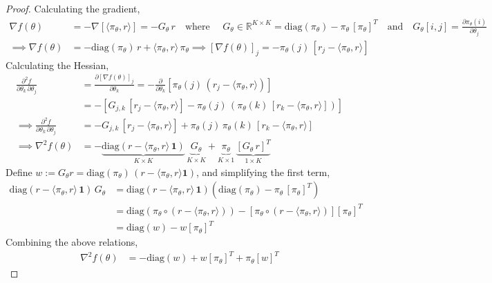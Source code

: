 \documentclass{article}
\newcommand{\R}{\mathbb{R}}
\begin{document}
\bandit*
\begin{proof}
Calculating the gradient, 
\begin{align}
\nabla f(\theta) &= - \nabla [\langle \pi_\theta, r \rangle ] = - G_\theta \, r \quad \text{where } \quad G_\theta \in \R^{K \times K} = \text{diag}(\pi_\theta) - \pi_\theta \, [\pi_\theta]^T \quad \text{and} \quad G_\theta[i,j] = \frac{\partial \pi_\theta(i)}{\partial \theta_j} \nonumber\\
\implies \nabla f(\theta) &= - \text{diag}(\pi_\theta) \, r + \langle \pi_\theta, r \rangle \, \pi_\theta \implies [\nabla f(\theta)]_j = -\pi_\theta(j) \, [r_j - \langle \pi_\theta, r \rangle ] \label{eq:pg-grad-inter-1}
\end{align}
Calculating the Hessian, 
\begin{align*}
\frac{\partial^2 f}{\partial \theta_k \,\partial  \theta_j} & = \frac{\partial [\nabla f(\theta)]_j}{\partial \theta_k} = -\frac{\partial}{\partial \theta_k} [ \pi_\theta(j) \, (r_j - \langle \pi_\theta, r \rangle )]   \\
& = - \left[ G_{j,k} \, [r_j - \langle \pi_\theta, r \rangle] - \pi_\theta(j) \,\left(\pi_\theta(k) \, [r_k - \langle \pi_\theta, r \rangle ] \right) \right] \\
\implies \frac{\partial^2 f}{\partial \theta_k \, \partial \theta_j} & = - G_{j,k} \, [r_j - \langle \pi_\theta, r \rangle] + \pi_\theta(j) \, \pi_\theta(k) \,  [r_k - \langle \pi_\theta, r \rangle ] \\
\implies \nabla^2 f(\theta) &= -\underbrace{\text{diag}(r - \langle \pi_\theta, r \rangle \, \mathbf{1})}_{K \times K} \, \underbrace{G_\theta}_{K \times K} + \underbrace{\pi_\theta}_{K \times 1} \, \underbrace{[G_\theta \, r]^T}_{1 \times K} 
\end{align*}
Define $w := G_\theta r = \text{diag}(\pi_\theta) \, (r - \langle \pi_\theta, r \rangle \mathbf{1})$, and simplifying the first term, 
\begin{align*}
\text{diag}(r - \langle \pi_\theta, r \rangle \, \mathbf{1}) \, G_\theta &= \text{diag}(r - \langle \pi_\theta, r \rangle \, \mathbf{1})  \left(\text{diag}(\pi_\theta) - \pi_\theta \, [\pi_\theta]^T\right) \\
& = \text{diag}(\pi_\theta \circ (r - \langle \pi_\theta, r \rangle ) ) - [\pi_\theta \circ (r - \langle \pi_\theta, r \rangle )] [\pi_\theta]^T \\
& = \text{diag}(w) - w [\pi_\theta]^T 
\end{align*}
Combining the above relations, 
\begin{align}
\nabla^2 f(\theta) &= -\text{diag}(w) + w [\pi_\theta]^T + \pi_\theta [w]^T \label{eq:pg-hessian-inter-1}     
\end{align}


\end{proof}
\end{document}

